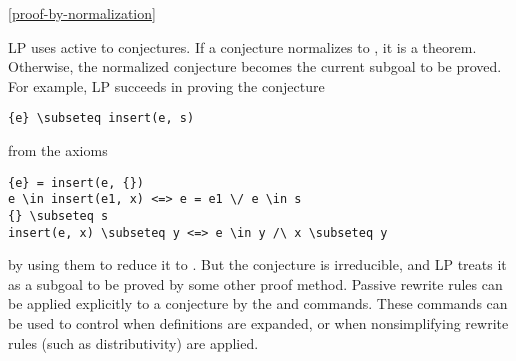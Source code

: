 \ref{proof-by-normalization}

LP uses active  to
  conjectures.  If a conjecture normalizes to 
, it is a theorem.  Otherwise, the normalized conjecture becomes the 
current subgoal to be proved.  For example, LP succeeds in proving the
conjecture
\begin{verbatim}
{e} \subseteq insert(e, s)
\end{verbatim}
from the axioms
\begin{verbatim}
{e} = insert(e, {})
e \in insert(e1, x) <=> e = e1 \/ e \in s
{} \subseteq s
insert(e, x) \subseteq y <=> e \in y /\ x \subseteq y
\end{verbatim}
by using them to reduce it to .  But the conjecture 
is irreducible, and LP treats it as a subgoal to be proved by some other proof
method.
\p
Passive rewrite rules can be applied explicitly to a conjecture by the
 and  commands.  These commands can be used
to control when definitions are expanded, or when nonsimplifying rewrite rules
(such as distributivity) are applied.
